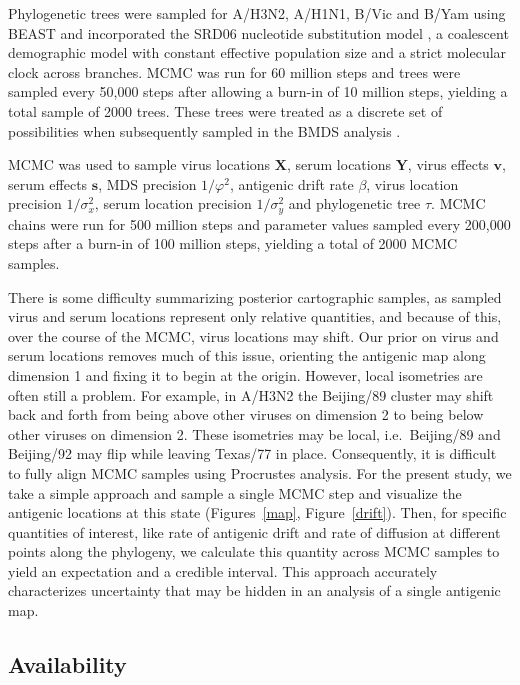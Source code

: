 \documentclass[11pt,oneside,letterpaper]{article}
\newcommand{\viruses}{\mathbf{X}}					%
\newcommand{\sera}{\mathbf{Y}}						%
\newcommand{\ves}{\mathbf{v}}						%
\newcommand{\ses}{\mathbf{s}}						%
\newcommand{\mdssd}{\varphi}						%
\newcommand{\virussd}{\sigma_x}						%
\newcommand{\serumsd}{\sigma_y}						%
\newcommand{\tree}{\tau}							%
\begin{document}
Phylogenetic trees were sampled for A/H3N2, A/H1N1, B/Vic and B/Yam using BEAST \cite{BEAST17} and incorporated the SRD06 nucleotide substitution model \cite{Shapiro06}, a coalescent demographic model with constant effective population size and a strict molecular clock across branches.
MCMC was run for 60 million steps and trees were sampled every 50,000 steps after allowing a burn-in of 10 million steps, yielding a total sample of 2000 trees.
These trees were treated as a discrete set of possibilities when subsequently sampled in the BMDS analysis \cite{Pagel04}.

MCMC was used to sample virus locations $\viruses$, serum locations $\sera$, virus effects $\ves$, serum effects $\ses$, MDS precision $1/\mdssd^2$, antigenic drift rate $\beta$, virus location precision $1/\virussd^2$, serum location precision $1/\serumsd^2$ and phylogenetic tree $\tree$.
MCMC chains were run for 500 million steps and parameter values sampled every 200,000 steps after a burn-in of 100 million steps, yielding a total of 2000 MCMC samples.

There is some difficulty summarizing posterior cartographic samples, as sampled virus and serum locations represent only relative quantities, and because of this, over the course of the MCMC, virus locations may shift.
Our prior on virus and serum locations removes much of this issue, orienting the antigenic map along dimension 1 and fixing it to begin at the origin.
However, local isometries are often still a problem.
For example, in A/H3N2 the Beijing/89 cluster may shift back and forth from being above other viruses on dimension 2 to being below other viruses on dimension 2.
These isometries may be local, i.e.\ Beijing/89 and Beijing/92 may flip while leaving Texas/77 in place.
Consequently, it is difficult to fully align MCMC samples using Procrustes analysis.
For the present study, we take a simple approach and sample a single MCMC step and visualize the antigenic locations at this state (Figures~\ref{map}, Figure~\ref{drift}).
Then, for specific quantities of interest, like rate of antigenic drift and rate of diffusion at different points along the phylogeny, we calculate this quantity across MCMC samples to yield an expectation and a credible interval.
This approach accurately characterizes uncertainty that may be hidden in an analysis of a single antigenic map.

\subsection*{Availability}
\end{document}
